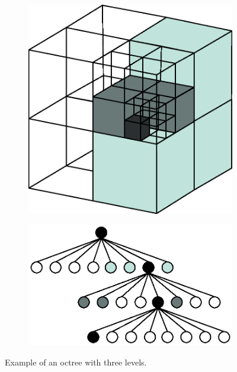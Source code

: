\begin{figure}[ht]
    \centering
    \begin{subfigure}[c]{0.33\textwidth}
        \vspace{0pt}
        \centering
        \includegraphics[width=\textwidth]{sections/theory/figures/octree-cube.eps}
    \end{subfigure}
    \hspace{1cm}
    \begin{subfigure}[c]{0.5\textwidth}
        \vspace{0pt}
        \centering
        \includegraphics[width=\textwidth]{sections/theory/figures/octree-tree.eps}
    \end{subfigure}
    \caption{Example of an octree with three levels.}
    \label{fig:octree-example}
\end{figure}

